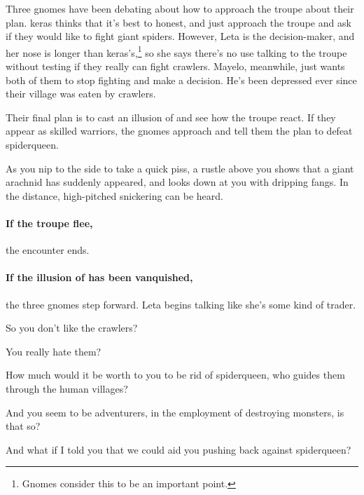 \begin{exampletext}
  Three gnomes have been debating about how to approach the troupe about their plan.
  \Gls{keras} thinks that it's best to honest, and just approach the troupe and ask if they would like to fight giant spiders.
  However, Leta is the decision-maker, and her nose is longer than \gls{keras}'s,\footnote{Gnomes consider this to be an important point.} so she says there's no use talking to the troupe without testing if they really can fight \glspl{crawler}.
  Mayelo, meanwhile, just wants both of them to stop fighting and make a decision.
  He's been depressed ever since their \gls{village} was eaten by \glspl{crawler}.

  Their final plan is to cast an illusion of  and see how the troupe react.
  If they appear as skilled warriors, the gnomes approach and tell them the plan to defeat \gls{spiderqueen}.
\end{exampletext}

\begin{boxtext}
  As you nip to the side to take a quick piss, a rustle above you shows that a giant arachnid has suddenly appeared, and looks down at you with dripping fangs.
  In the distance, high-pitched snickering can be heard.
\end{boxtext}

\paragraph{If the troupe flee,}
the encounter ends.

\paragraph{If the illusion of  has been vanquished,}
the three gnomes step forward.
Leta begins talking like she's some kind of trader.

\begin{speechtext}

  So you don't like the \glspl{crawler}?

  You really hate them?

  How much would it be worth to you to be rid of \gls{spiderqueen}, who guides them through the human \glspl{village}?

  And you seem to be adventurers, in the employment of destroying monsters, is that so?

  And what if I told you that we could aid you pushing back against \gls{spiderqueen}?

\end{speechtext}

